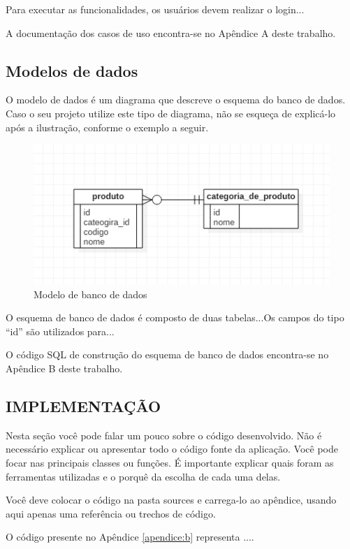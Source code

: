Para executar as funcionalidades, os usuários devem realizar o login...

A documentação dos casos de uso encontra-se no Apêndice A deste trabalho.

\subsection{Modelos de dados}

O modelo de dados é um diagrama que descreve o esquema do banco de dados. Caso o seu projeto utilize este tipo de diagrama, não se esqueça de explicá-lo após a ilustração, conforme o exemplo a seguir.

\begin{figure}[htb]
    \begin{center}
	    \includegraphics{images/figura3.png}
	\end{center}
	\caption{\label{fig:Fig_3}Modelo de banco de dados}
\end{figure}

O esquema de banco de dados é composto de duas tabelas...Os campos do tipo “id” são utilizados para...

O código SQL de construção do esquema de banco de dados encontra-se no Apêndice B deste trabalho.

\subsection{IMPLEMENTAÇÃO}

Nesta seção você pode falar um pouco sobre o código desenvolvido. Não é necessário explicar ou apresentar todo o código fonte da aplicação. Você pode focar nas principais classes ou funções. É importante explicar quais foram as ferramentas utilizadas e o porquê da escolha de cada uma delas.

Você deve colocar o código na pasta sources e carrega-lo ao apêndice, usando aqui apenas uma referência ou trechos de código.

O código presente no Apêndice \ref{apendice:b} representa ....